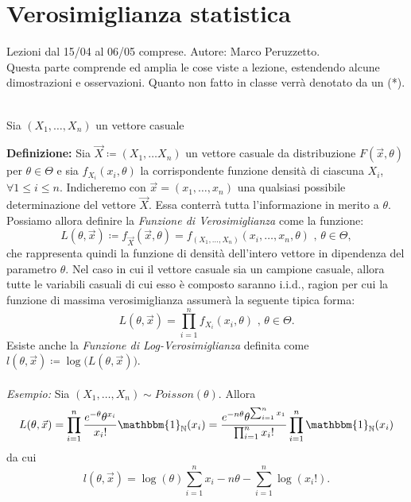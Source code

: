 \chapter{Verosimiglianza statistica}
Lezioni dal 15/04 al 06/05 comprese. Autore: Marco Peruzzetto.\\
Questa parte comprende ed amplia le cose viste a lezione, estendendo alcune dimostrazioni e osservazioni. Quanto non fatto in classe verrà denotato da un (*).\\
\\
\begin{dfn}
  Sia \((X_1,\dotsc,X_n)\) un vettore casuale
\end{dfn}
\textbf{Definizione:} Sia $\vec{X}\coloneqq (X_1,\ldots X_n)$ un vettore casuale da distribuzione $F(\vec{x}, \theta)$ per $\theta\in \Theta$ e sia $f_{X_i}(x_i,\theta)$ la corrispondente funzione densità di ciascuna $X_i$, $\forall 1\leq i\leq n$. Indicheremo con $\vec{x}=(x_1,\ldots,x_n)$ una qualsiasi possibile determinazione del vettore $\vec{X}$. Essa conterrà tutta l'informazione in merito a $\theta$. Possiamo allora definire la \textit{Funzione di Verosimiglianza} come la funzione:
$$L\left(\theta, \vec{x}\right)\coloneqq f_{\vec{X}}(\vec{x},\theta)=f_{(X_1,\ldots,X_n)}(x_i,\ldots,x_n,\theta)\mbox{ , } \theta\in \Theta, $$ che rappresenta quindi la funzione di densità dell'intero vettore in dipendenza del parametro $\theta$. Nel caso in cui il vettore casuale sia un campione casuale, allora tutte le variabili casuali di cui esso è composto saranno i.i.d., ragion per cui la funzione di massima verosimiglianza assumerà la seguente tipica forma:
$$L\left(\theta, \vec{x}\right)=\prod_{i=1}^n f_{X_i}\left(x_i, \theta\right) \mbox{ , } \theta\in \Theta.$$
Esiste anche la \textit{Funzione di Log-Verosimiglianza} definita come $l(\theta,\vec{x})\coloneqq \log\big(L(\theta, \vec{x})\big)$. 
\\ 
\\
\textit{Esempio:} Sia $(X_1,\ldots,X_n)\sim Poisson(\theta)$. Allora $$L(\theta, \vec{x})=\prod_{i=1}^n \frac{e^{-\theta}\theta^{x_i}}{x_i !}\mathbbm{1}_{\mathbb{N}}(x_i)=\frac{e^{-n\theta}\theta^{\sum_{i=1}^n x_1}}{\prod_{i=1}^n x_i !}\prod_{i=1}^n \mathbbm{1}_{\mathbb{N}}(x_i)$$ da cui $$l(\theta, \vec{x})=\log(\theta)\sum_{i=1}^n x_i   -n\theta - \sum_{i=1}^n \log(x_i !).$$ 
\\ \\
